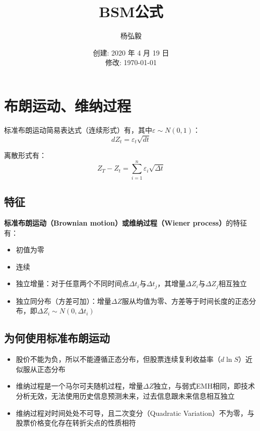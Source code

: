 \documentclass[11pt]{article}
\title{BSM公式}
\author{杨弘毅}
\date{创建: 2020 年 4 月 19 日 \\修改: \today}
\begin{document}
\maketitle

\tableofcontents

\section{布朗运动、维纳过程}

标准布朗运动简易表达式（连续形式）有，其中$\varepsilon \sim N(0,1)$：
\begin{equation*}
    dZ_t = \varepsilon_t \sqrt{dt}
\end{equation*}

离散形式有：
\begin{equation*}
    Z_T - Z_t = \sum^n_{i=1} \varepsilon_i \sqrt{\Delta t}
\end{equation*}

\subsection{特征}
\textbf{标准布朗运动（Brownian motion）或维纳过程（Wiener process）}的特征有：
\begin{itemize}
    \setlength{\itemsep}{0em}
    \item 初值为零
    \item 连续
    \item 独立增量：对于任意两个不同时间点$\Delta t_i$与$\Delta t_j$，其增量$\Delta Z_i$与$\Delta Z_j$相互独立
    \item 独立同分布（方差可加）：增量$\Delta Z$服从均值为零、方差等于时间长度的正态分布，即$\Delta Z_i  \sim N(0,\Delta t_i)$
\end{itemize}

\subsection{为何使用标准布朗运动}

\begin{itemize}
    \setlength{\itemsep}{0em}
    \item 股价不能为负，所以不能遵循正态分布，但股票连续复利收益率（$d\ln S$）近似服从正态分布
    \item 维纳过程是一个马尔可夫随机过程，增量$\Delta Z$独立，与弱式EMH相同，即技术分析无效，无法使用历史信息预测未来，过去信息跟未来信息相互独立
    \item 维纳过程对时间处处不可导，且二次变分（Quadratic Variation）不为零，与股票价格变化存在转折尖点的性质相符
\end{itemize}
\end{document}
